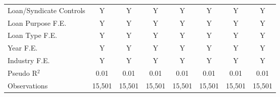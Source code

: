 {\begin{tabular}{l*{7}{c}}
Loan/Syndicate Controls&        Y         &        Y         &        Y         &        Y         &        Y         &        Y         &        Y         \\
Loan Purpose F.E.&        Y         &        Y         &        Y         &        Y         &        Y         &        Y         &        Y         \\
Loan Type F.E.  &        Y         &        Y         &        Y         &        Y         &        Y         &        Y         &        Y         \\
Year F.E.       &        Y         &        Y         &        Y         &        Y         &        Y         &        Y         &        Y         \\
Industry F.E.   &        Y         &        Y         &        Y         &        Y         &        Y         &        Y         &        Y         \\

Pseudo R$ ^2 $  &     0.01         &     0.01         &     0.01         &     0.01         &     0.01         &     0.01         &     0.01         \\
Observations    &   15,501         &   15,501         &   15,501         &   15,501         &   15,501         &   15,501         &   15,501         \\
\bottomrule
\end{tabular}
}
